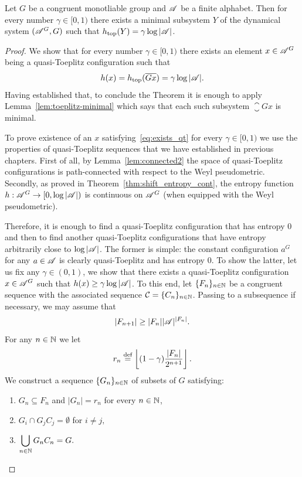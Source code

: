 \begin{thm}\label{Krieger2}
Let $G$ be a congruent monotliable group and $\mathscr{A}$ be a finite alphabet. Then  for every number $\gamma\in[0,1)$ there exists a minimal subsystem $Y$ of the dynamical system $(\mathscr{A}^G,G)$ such that $h_\mathrm{top}(Y)=\gamma\log |\mathscr{A}|$.
\end{thm}


\begin{proof}
We show that for every number $\gamma \in [0,1)$ there exists an element $x\in \mathscr{A}^G$ being a quasi-Toeplitz configuration such that
\begin{equation}\label{eq:exists_qt}
h(x) = h_\mathrm{top}(\overline{Gx}) = \gamma \log |\mathscr{A}|.
\end{equation}
Having established that,  to conclude the Theorem it is enough to apply Lemma~\ref{lem:toeplitz-minimal} which says that each such subsystem $\closure{Gx}$ is minimal.

To prove existence of an $x$ satisfying~\eqref{eq:exists_qt} for every $\gamma \in [0,1)$ we use the properties of quasi-Toeplitz sequences that we have established in previous chapters.
%
First of all, by Lemma~\ref{lem:connected2} the space of quasi-Toeplitz configurations is path-connected with respect to the Weyl pseudometric.
%
Secondly, as proved in Theorem~\ref{thm:shift_entropy_cont}, the entropy function $h: \mathscr{A}^G \to [0, \log |\mathscr{A}|)$  is continuous on $\mathscr{A}^G$ (when equipped with the Weyl pseudometric).
%

Therefore, it is enough to find a quasi-Toeplitz configuration that has entropy $0$ and then to find another quasi-Toeplitz configurations that have entropy arbitrarily close to $\log |\mathscr{A}|$.
% 
The former is simple: the constant configuration $a^G$ for any $a\in \mathscr{A}$ is clearly quasi-Toeplitz and has entropy $0$.
%
To show the latter, let us fix any $\gamma\in(0,1)$, we show that there exists a quasi-Toeplitz configuration $x\in\mathscr{A}^G$ such that $h(x)\geq\gamma\log|\mathscr{A}|$. 
%
To this end, let $\{F_n\}_{n\in\mathbb{N}}$ be a congruent \Folner sequence with the associated \elegant sequence $\operatorname{\mathcal{C}}=\{C_n\}_{n\in\mathbb{N}}$. Passing to a subsequence if necessary, we may assume that $$|F_{n+1}|\geq |F_n||\mathscr{A}|^{|F_n|}.$$ For any $n\in\mathbb{N}$ we let 
\[
r_n\stackrel{\textup{def}}{=}\left\lfloor (1-\gamma)\frac{|F_n|}{2^{n+1}}\right\rfloor.
\] 
We construct a sequence $\{G_n\}_{n\in\mathbb{N}}$ of subsets of $G$ satisfying:
\begin{enumerate}
\item $G_n\subseteq F_n$ and $|G_n|=r_n$ for every $n\in\mathbb{N}$,
\item  $\displaystyle G_i\cap G_jC_j =\emptyset$ for $i\neq j,$
\item\label{cond3} $\displaystyle\bigcup_{n\in\mathbb{N} } G_nC_n=G.$
\end{enumerate}


\end{proof}
